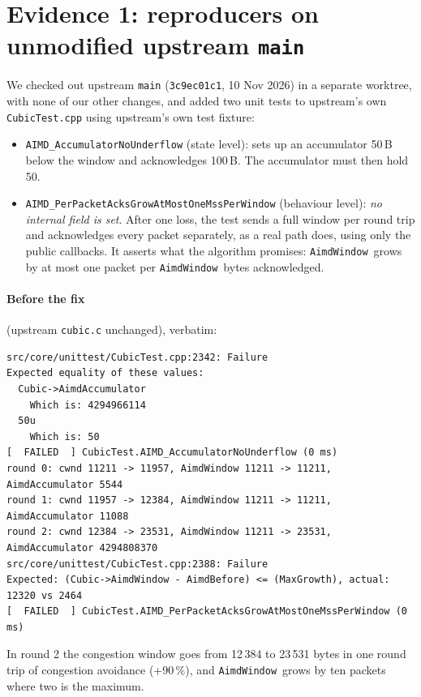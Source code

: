 \documentclass[11pt,a4paper]{article}
\newcommand{\aw}{\texttt{AimdWindow}}
\begin{document}
\section{Evidence 1: reproducers on unmodified upstream \texttt{main}}
\label{sec:repro1}

We checked out upstream \texttt{main} (\texttt{3c9ec01c1}, 10 Nov 2026) in a
separate worktree, with none of our other changes, and added two unit tests
to upstream's own \texttt{CubicTest.cpp} using upstream's own test fixture:
\begin{itemize}
  \item \texttt{AIMD\_AccumulatorNoUnderflow} (state level): sets up an
        accumulator 50\,B below the window and acknowledges 100\,B. The
        accumulator must then hold 50.
  \item \texttt{AIMD\_PerPacketAcksGrowAtMostOneMssPerWindow} (behaviour
        level): \emph{no internal field is set}. After one loss, the test sends
        a full window per round trip and acknowledges every packet separately,
        as a real path does, using only the public callbacks. It asserts what
        the algorithm promises: \aw\ grows by at most one packet per \aw\ bytes
        acknowledged.
\end{itemize}

\paragraph{Before the fix} (upstream \texttt{cubic.c} unchanged), verbatim:
\begin{lstlisting}[style=out]
src/core/unittest/CubicTest.cpp:2342: Failure
Expected equality of these values:
  Cubic->AimdAccumulator
    Which is: 4294966114
  50u
    Which is: 50
[  FAILED  ] CubicTest.AIMD_AccumulatorNoUnderflow (0 ms)
round 0: cwnd 11211 -> 11957, AimdWindow 11211 -> 11211, AimdAccumulator 5544
round 1: cwnd 11957 -> 12384, AimdWindow 11211 -> 11211, AimdAccumulator 11088
round 2: cwnd 12384 -> 23531, AimdWindow 11211 -> 23531, AimdAccumulator 4294808370
src/core/unittest/CubicTest.cpp:2388: Failure
Expected: (Cubic->AimdWindow - AimdBefore) <= (MaxGrowth), actual: 12320 vs 2464
[  FAILED  ] CubicTest.AIMD_PerPacketAcksGrowAtMostOneMssPerWindow (0 ms)
\end{lstlisting}
In round 2 the congestion window goes from 12\,384 to 23\,531 bytes in one
round trip of congestion avoidance (+90\,\%), and \aw\ grows by ten packets
where two is the maximum.
\end{document}
